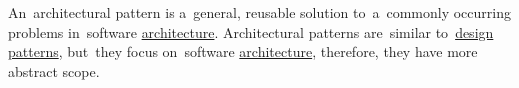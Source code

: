 \label{architecturalpatterns}
An~architectural pattern is a~general, reusable solution to~a~commonly occurring problems in~software \hyperref[architecturedesign]{architecture}.
Architectural patterns are~similar to~\hyperref[designpatterns]{design patterns}, but~they focus on~software \hyperref[architecturedesign]{architecture}, therefore, they have more abstract scope.

